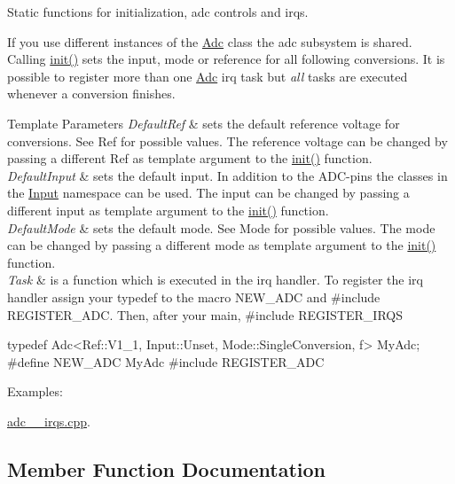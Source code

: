 Static functions for initialization, adc controls and irqs. 

If you use different instances of the \hyperlink{classadc_1_1Adc}{Adc} class the adc subsystem is shared. Calling \hyperlink{classadc_1_1Adc_ae453bb940554c62082776bd41a9053a3}{init()} sets the input, mode or reference for all following conversions. It is possible to register more than one \hyperlink{classadc_1_1Adc}{Adc} irq task but {\itshape all} tasks are executed whenever a conversion finishes.


\begin{DoxyTemplParams}{Template Parameters}
{\em Default\+Ref} & sets the default reference voltage for conversions. See Ref for possible values. The reference voltage can be changed by passing a different Ref as template argument to the \hyperlink{classadc_1_1Adc_ae453bb940554c62082776bd41a9053a3}{init()} function. \\
\hline
{\em Default\+Input} & sets the default input. In addition to the A\+D\+C-\/pins the classes in the \hyperlink{namespaceadc_1_1Input}{Input} namespace can be used. The input can be changed by passing a different input as template argument to the \hyperlink{classadc_1_1Adc_ae453bb940554c62082776bd41a9053a3}{init()} function. \\
\hline
{\em Default\+Mode} & sets the default mode. See Mode for possible values. The mode can be changed by passing a different mode as template argument to the \hyperlink{classadc_1_1Adc_ae453bb940554c62082776bd41a9053a3}{init()} function. \\
\hline
{\em Task} & is a function which is executed in the irq handler. To register the irq handler assign your typedef to the macro {\ttfamily N\+E\+W\+\_\+\+A\+DC} and {\ttfamily \#include R\+E\+G\+I\+S\+T\+E\+R\+\_\+\+A\+DC}. Then, after your main, {\ttfamily \#include R\+E\+G\+I\+S\+T\+E\+R\+\_\+\+I\+R\+QS}\\
\hline
\end{DoxyTemplParams}
\begin{DoxyVerb}typedef Adc<Ref::V1_1, Input::Unset, Mode::SingleConversion, f> MyAdc;
#define NEW_ADC MyAdc
#include REGISTER_ADC\end{DoxyVerb}
 \begin{Desc}
\item[Examples\+: ]\par
\hyperlink{adc_2_irqs_8cpp-example}{adc\+\_\+\_\+irqs.\+cpp}.\end{Desc}


\subsection{Member Function Documentation}
